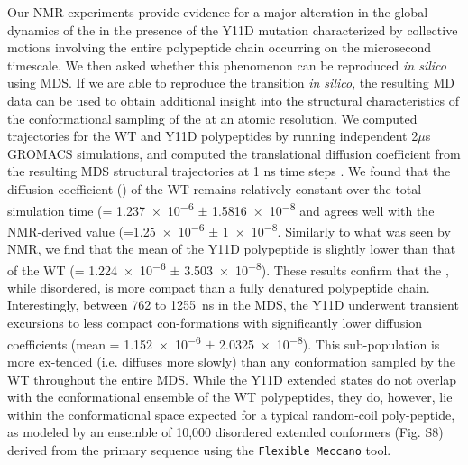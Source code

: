 Our NMR experiments provide evidence for a major alteration in the global dynamics of the \gct{} in the presence of the Y11D mutation characterized by collective motions involving the entire polypeptide chain occurring on the microsecond timescale. We then asked whether this phenomenon can be reproduced \textit{in silico} using MDS.  If we are able to reproduce the transition \textit{in silico}, the resulting MD data can be used to obtain additional insight into the structural characteristics of the conformational sampling of the \gct{} at an atomic resolution. We computed trajectories for the WT and Y11D \gct{} polypeptides by running independent 2$\mu$s GROMACS simulations, and computed the translational diffusion coefficient from the resulting MDS structural trajectories at 1 ns time steps . We found that the diffusion coefficient (\diffusion) of the WT \gct{} remains relatively constant over the total simulation time (\diffusion = \num{1.237e-6} $\pm$ \SI{1.5816e-8}{\dcunits} and agrees well with the NMR-derived value (\diffusion=\num{1.25e-6} $\pm$  \SI{1e-8}{\dcunits}.  Similarly to what was seen by NMR, we find that the mean \diffusion of the Y11D \gct{} polypeptide is slightly lower than that of the WT \gct{} (\diffusion= \num{1.224e-6} $\pm$ \SI{3.503e-8}{\dcunits}). These results confirm that the \gct{}, while disordered, is more compact than a fully denatured polypeptide chain. Interestingly, between \num{762} to \SI{1255}{\ns} in the MDS, the Y11D \gct{} underwent transient excursions to less compact con-formations with significantly lower diffusion coefficients (mean \diffusion= \num{1.152e-6} $\pm$ \SI{2.0325e-8}{\dcunits}). This sub-population is more ex-tended (i.e. diffuses more slowly) than any conformation sampled by the WT \gct{} throughout the entire MDS. While the Y11D \gct{} extended states do not overlap with the conformational ensemble of the WT \gct{} polypeptides, they do, however, lie within the conformational space expected for a typical random-coil poly-peptide, as modeled by an ensemble of 10,000 disordered extended conformers (Fig. S8) derived from the \gct{} primary sequence using the \texttt{Flexible Meccano} tool.  

